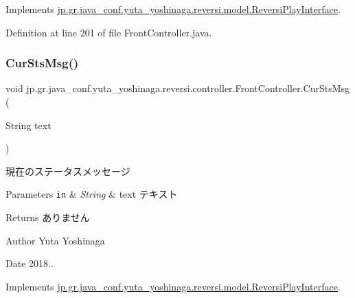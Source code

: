 Implements \hyperlink{interfacejp_1_1gr_1_1java__conf_1_1yuta__yoshinaga_1_1reversi_1_1model_1_1_reversi_play_interface}{jp.\+gr.\+java\+\_\+conf.\+yuta\+\_\+yoshinaga.\+reversi.\+model.\+Reversi\+Play\+Interface}.



Definition at line 201 of file Front\+Controller.\+java.

\mbox{\label{classjp_1_1gr_1_1java__conf_1_1yuta__yoshinaga_1_1reversi_1_1controller_1_1_front_controller_a49315230e704778721afb73c59e14d88}} 
\subsubsection{\texorpdfstring{Cur\+Sts\+Msg()}{CurStsMsg()}}
{\footnotesize\ttfamily void jp.\+gr.\+java\+\_\+conf.\+yuta\+\_\+yoshinaga.\+reversi.\+controller.\+Front\+Controller.\+Cur\+Sts\+Msg (\begin{DoxyParamCaption}\item[{String}]{text }\end{DoxyParamCaption})}



現在のステータスメッセージ 


\begin{DoxyParams}[1]{Parameters}
\mbox{\tt in}  & {\em String} & text テキスト \\
\hline
\end{DoxyParams}
\begin{DoxyReturn}{Returns}
ありません 
\end{DoxyReturn}
\begin{DoxyAuthor}{Author}
Yuta Yoshinaga 
\end{DoxyAuthor}
\begin{DoxyDate}{Date}
2018.. 
\end{DoxyDate}


Implements \hyperlink{interfacejp_1_1gr_1_1java__conf_1_1yuta__yoshinaga_1_1reversi_1_1model_1_1_reversi_play_interface}{jp.\+gr.\+java\+\_\+conf.\+yuta\+\_\+yoshinaga.\+reversi.\+model.\+Reversi\+Play\+Interface}.



